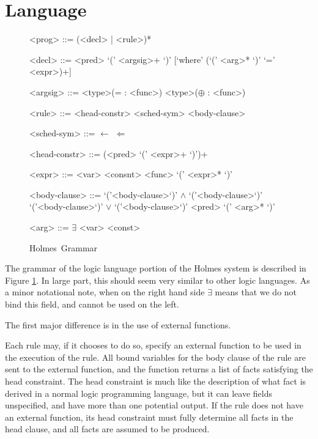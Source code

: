 \documentclass{article}
\newcommand{\sysname}{Holmes}
\begin{document}
\section{Language}
\begin{figure}
\begin{grammar}

<prog> ::= (<decl> | <rule>)*

<decl> ::= <pred> `(' <argsig>+ `)' [`where' (`(' <arg>* `)' `=' <expr>)+]

<argsig>
::=  <type>(= : <func>)
\alt <type>($\oplus$ : <func>)

<rule> ::= <head-constr> <sched-sym> <body-clause>

<sched-sym> ::= $\leftarrow$
\alt $\Leftarrow$

<head-constr> ::= (<pred> `(' <expr>+ `)')+

<expr> ::= <var>
\alt <consnt>
\alt <func> `(' <expr>* `)'

<body-clause>
::=  `('<body-clause>`)' $\wedge$ `('<body-clause>`)'
\alt `('<body-clause>`)' $\vee$ `('<body-clause>`)'
\alt <pred> `(' <arg>* `)'

<arg> ::= $\exists$ \alt <var> \alt <const>
\end{grammar}
\label{fig:holmesGrammar}
\caption{\sysname\ Grammar}
\end{figure}
The grammar of the logic language portion of the Holmes system is described in  Figure \ref{fig:holmesGrammar}.
In large part, this should seem very similar to other logic languages.
As a minor notational note, when on the right hand side $\exists$ means that we do not bind this field, and cannot be used on the left.

The first major difference is in the use of external functions.


Each rule may, if it chooses to do so, specify an external function to be used in the execution of the rule.
All bound variables for the body clause of the rule are sent to the external function, and the function returns a list of facts satisfying the head constraint.
The head constraint is much like the description of what fact is derived in a normal logic programming language, but it can leave fields unspecified, and have more than one potential output.
If the rule does not have an external function, its head constraint must fully determine all facts in the head clause, and all facts are assumed to be produced.
\end{document}
